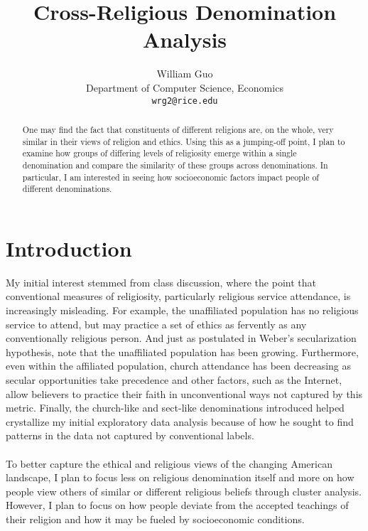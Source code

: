 \documentclass{article}
\title{Cross-Religious Denomination Analysis}
\author{
	William Guo\\
	Department of Computer Science, Economics \\
	\texttt{wrg2@rice.edu} \\
}
\begin{document}
	\maketitle
	
	\begin{abstract}
	One may find the fact that constituents of different religions are, on the whole, very similar in their views of religion and ethics. Using this as a jumping-off point, I plan to examine how groups of differing levels of religiosity emerge within a single denomination and compare the similarity of these groups across denominations. In particular, I am interested in seeing how socioeconomic factors impact people of different denominations.
	\end{abstract}
	
	\section{Introduction}
	My initial interest stemmed from class discussion, where the point that conventional measures of religiosity, particularly religious service attendance, is increasingly misleading. For example, the unaffiliated population has no religious service to attend, but may practice a set of ethics as fervently as any conventionally religious person. And just as postulated in Weber's secularization hypothesis, \cite{inc_secularization} note that the unaffiliated population has been growing. Furthermore, even within the affiliated population, church attendance has been decreasing as secular opportunities take precedence and other factors, such as the Internet, allow believers to practice their faith in unconventional ways not captured by this metric. Finally, the church-like and sect-like denominations \cite{sects} introduced helped crystallize my initial exploratory data analysis because of how he sought to find patterns in the data not captured by conventional labels.
	\\
	\\
	To better capture the ethical and religious views of the changing American landscape, I plan to focus less on religious denomination itself and more on how
	people view others of similar or different religious beliefs through cluster analysis. However, I plan to focus on how people deviate from the accepted teachings of their religion and how it may be fueled by socioeconomic conditions.
	
\end{document}
